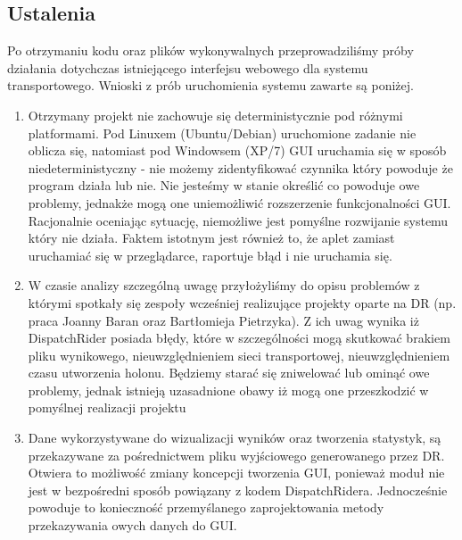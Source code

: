 \subsection{Ustalenia}
Po otrzymaniu kodu oraz plików wykonywalnych przeprowadziliśmy próby działania dotychczas istniejącego interfejsu webowego dla systemu transportowego. Wnioski z prób uruchomienia systemu zawarte są poniżej.
\\  
\begin{enumerate}
\item Otrzymany projekt nie zachowuje się deterministycznie pod różnymi platformami. Pod Linuxem (Ubuntu/Debian) uruchomione zadanie nie oblicza się, natomiast pod Windowsem (XP/7) GUI uruchamia się w sposób niedeterministyczny - nie możemy zidentyfikować czynnika który powoduje że program działa lub nie. Nie jesteśmy w stanie określić co powoduje owe problemy, jednakże mogą one uniemożliwić rozszerzenie funkcjonalności GUI. Racjonalnie oceniając sytuację, niemożliwe jest pomyślne rozwijanie systemu który nie działa. Faktem istotnym jest również to, że aplet zamiast uruchamiać się w przeglądarce, raportuje błąd i nie uruchamia się.
\item W czasie analizy szczególną uwagę przyłożyliśmy do opisu problemów z którymi spotkały się zespoły wcześniej realizujące projekty oparte na DR (np. praca Joanny Baran oraz Bartłomieja Pietrzyka). Z ich uwag wynika iż DispatchRider posiada błędy, które w szczególności mogą skutkować brakiem pliku wynikowego, nieuwzględnieniem sieci transportowej, nieuwzględnieniem czasu utworzenia holonu. Będziemy starać się zniwelować lub ominąć owe problemy, jednak istnieją uzasadnione obawy iż mogą one przeszkodzić w pomyślnej realizacji projektu 
\item Dane wykorzystywane do wizualizacji wyników oraz tworzenia statystyk, są przekazywane za pośrednictwem pliku wyjściowego generowanego przez DR. Otwiera to możliwość zmiany koncepcji tworzenia GUI, ponieważ moduł nie jest w bezpośredni sposób powiązany z kodem DispatchRidera. Jednocześnie powoduje to konieczność przemyślanego zaprojektowania metody przekazywania owych danych do GUI.
\end{enumerate}

